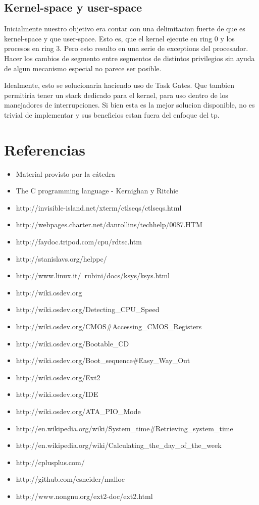 \documentclass[a4paper,10pt]{article}
\begin{document}
\subsection{Kernel-space y user-space}
Inicialmente nuestro objetivo era contar con una delimitacion fuerte de que es kernel-space y que user-space.
Esto es, que el kernel ejecute en ring 0 y los procesos en ring 3.
Pero esto resulto en una serie de exceptions del procesador.
Hacer los cambios de segmento entre segmentos de distintos privilegios sin ayuda de algun mecanismo especial no parece ser posible.

Idealmente, esto se solucionaria haciendo uso de Task Gates.
Que tambien permitiria tener un stack dedicado para el kernel, para uso dentro de los manejadores de interrupciones.
Si bien esta es la mejor solucion disponible, no es trivial de implementar y sus beneficios estan fuera del enfoque del tp.

\newpage     
\section{Referencias}

\begin{itemize}
  \item Material provisto por la cátedra
  \item The C programming language - Kernighan y Ritchie
  \item http://invisible-island.net/xterm/ctlseqs/ctlseqs.html
  \item http://webpages.charter.net/danrollins/techhelp/0087.HTM
  \item http://faydoc.tripod.com/cpu/rdtsc.htm
  \item http://stanislavs.org/helppc/
  \item http://www.linux.it/~rubini/docs/ksys/ksys.html
  \item http://wiki.osdev.org
  \item http://wiki.osdev.org/Detecting\_CPU\_Speed
  \item	http://wiki.osdev.org/CMOS\#Accessing\_CMOS\_Registers
  \item http://wiki.osdev.org/Bootable\_CD
  \item http://wiki.osdev.org/Boot\_sequence\#Easy\_Way\_Out
  \item http://wiki.osdev.org/Ext2
  \item http://wiki.osdev.org/IDE
  \item http://wiki.osdev.org/ATA\_PIO\_Mode
  \item http://en.wikipedia.org/wiki/System\_time\#Retrieving\_system\_time
  \item http://en.wikipedia.org/wiki/Calculating\_the\_day\_of\_the\_week
  \item http://cplusplus.com/
  \item http://github.com/esneider/malloc
  \item http://www.nongnu.org/ext2-doc/ext2.html
\end{itemize}
   
\end{document}
